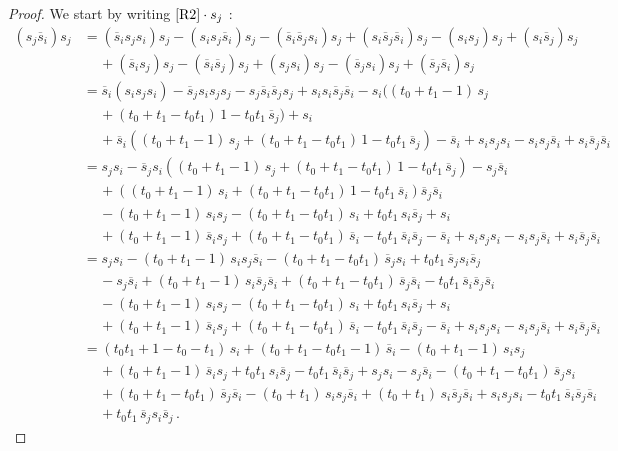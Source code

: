 \documentclass[12pt,reqno]{amsart}
\theoremstyle{definition}
\def\hs{\overline{s}}
\begin{document}
\begin{proof}
We start by writing $\eqref{R2} \cdot s_j$ : 
\begin{align*}
  (s_j \hs_i) s_j&  =   (\hs_i s_j s_i) s_j - (s_i s_j \hs_i)s_j
  - (\hs_i \hs_j s_i) s_j + (s_i \hs_j \hs_i) s_j - (s_i s_j)s_j + (s_i \hs_j)s_j \\
  &\phantom{sii} + (\hs_i s_j)s_j
  - (\hs_i \hs_j)s_j + (s_j s_i)s_j - (\hs_j s_i)s_j + (\hs_j \hs_i)s_j\\
   &  = \hs_i (s_i s_j s_i) - \hs_j s_i s_j s_j - s_j \hs_i \hs_j s_j
   + s_i s_i \hs_j \hs_i - s_i((t_0 + t_1 -1) \, s_j \\
   &\phantom{sii}  +(t_0 + t_1 - t_0 t_1) \,
   1 - t_0 t_1 \, \hs_j) + s_i \\
   &\phantom{sii} + \hs_i((t_0 + t_1 -1) \, s_j +(t_0 + t_1 - t_0 t_1) \,
   1 - t_0 t_1 \, \hs_j) - \hs_i + s_i s_j s_i - s_i s_j \hs_i + s_i \hs_j \hs_i\\
    &   =   s_j s_i - \hs_j s_i ((t_0 + t_1 -1) \, s_j +(t_0 + t_1 - t_0 t_1)
    \, 1 - t_0 t_1 \, \hs_j) - s_j \hs_i \\
   &\phantom{sii} + ((t_0 + t_1 -1) \, s_i +(t_0 + t_1 - t_0 t_1)
   \, 1 - t_0 t_1 \, \hs_i) \hs_j \hs_i \\
   &\phantom{sii} - (t_0 + t_1 -1) \, s_i s_j - (t_0 + t_1 - t_0 t_1)
   \, s_i + t_0 t_1 \, s_i \hs_j + s_i\\
   &\phantom{sii}  + (t_0 + t_1 -1) \, \hs_i s_j + (t_0 + t_1 - t_0 t_1)
   \, \hs_i - t_0 t_1 \, \hs_i \hs_j - \hs_i + s_i s_j s_i - s_i s_j \hs_i
   + s_i \hs_j \hs_i  \\
    &   =  s_j s_i - (t_0 + t_1 -1) \, s_i s_j \hs_i - (t_0 + t_1 - t_0 t_1)
    \, \hs_j s_i + t_0 t_1 \, \hs_j s_i \hs_j\\
    &\phantom{sii} - s_j \hs_i + (t_0 + t_1 -1) \, s_i \hs_j \hs_i
    + (t_0 + t_1 - t_0 t_1)
   \, \hs_j \hs_i - t_0 t_1 \, \hs_i \hs_j \hs_i\\
   &\phantom{sii} - (t_0 + t_1 -1) \, s_i s_j - (t_0 + t_1 - t_0 t_1)
   \, s_i + t_0 t_1 \, s_i \hs_j + s_i\\
   &\phantom{sii} + (t_0 + t_1 -1) \, \hs_i s_j + (t_0 + t_1 - t_0 t_1)
   \, \hs_i - t_0 t_1 \, \hs_i \hs_j - \hs_i + s_i s_j s_i - s_i s_j \hs_i
   + s_i \hs_j \hs_i\\
   &   =  (t_0 t_1 +1 -t_0 -t_1) \, s_i + (t_0 + t_1 - t_0 t_1 -1) \,
   \hs_i - (t_0 + t_1 -1) \, s_i s_j \\
   &\phantom{sii} + (t_0 + t_1 -1)
   \, \hs_i s_j + t_0 t_1 \, s_i \hs_j - t_0 t_1 \, \hs_i \hs_j
   + s_j s_i - s_j \hs_i - (t_0 + t_1 - t_0 t_1)
   \, \hs_j s_i\\
   &\phantom{sii}  + (t_0 + t_1 - t_0 t_1) \, \hs_j \hs_i
   - (t_0 + t_1) \, s_i s_j \hs_i + (t_0 + t_1)
   \, s_i \hs_j \hs_i + s_i s_j s_i - t_0 t_1 \, \hs_i \hs_j \hs_i\\
   &\phantom{sii} + t_0 t_1 \, \hs_j s_i \hs_j \,.
\end{align*}
\end{proof}
\end{document}
